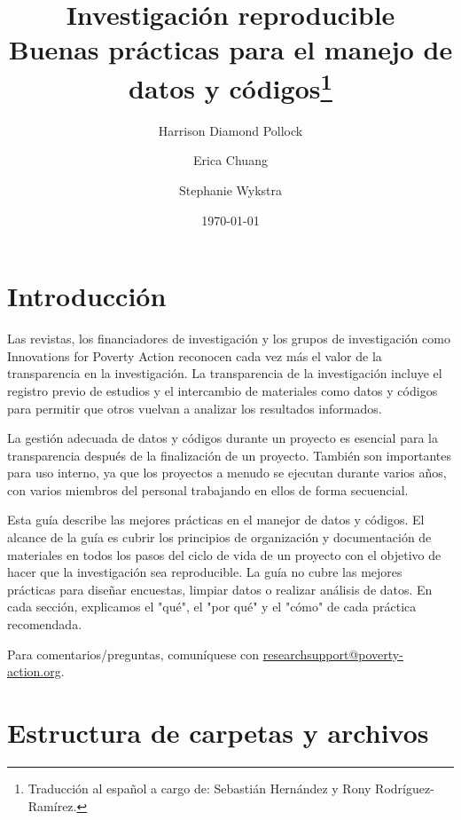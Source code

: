 \documentclass[11pt,en]{elegantpaper}
\title{Investigación reproducible \\ Buenas prácticas para el manejo de datos y códigos\footnote{Traducción al español a cargo de: Sebastián Hernández y Rony Rodríguez-Ramírez.}}
\author{Harrison Diamond Pollock \and Erica Chuang \and Stephanie Wykstra}
\date{\today}
\begin{document}
\maketitle
\tableofcontents
\newpage 
\section{Introducción}
\label{sec:intro}

Las revistas, los financiadores de investigación y los grupos de investigación como Innovations for Poverty Action reconocen cada vez más el valor de la transparencia en la investigación. La transparencia de la investigación incluye el registro previo de estudios y el intercambio de materiales como datos y códigos para permitir que otros vuelvan a analizar los resultados informados.

La gestión adecuada de datos y códigos durante un proyecto es esencial para la transparencia después de la finalización de un proyecto. También son importantes para uso interno, ya que los proyectos a menudo se ejecutan durante varios años, con varios miembros del personal trabajando en ellos de forma secuencial.

Esta guía describe las mejores prácticas en el manejor de datos y códigos. El alcance de la guía es cubrir los principios de organización y documentación de materiales en todos los pasos del ciclo de vida de un proyecto con el objetivo de hacer que la investigación sea reproducible. La guía no cubre las mejores prácticas para diseñar encuestas, limpiar datos o realizar análisis de datos. En cada sección, explicamos el "qué", el "por qué" y el "cómo" de cada práctica recomendada.

Para comentarios/preguntas, comuníquese con \href{mailto:researchsupport@poverty-action.org}{researchsupport@poverty-action.org}.

\newpage 
\section{Estructura de carpetas y archivos}
\label{sec:estructura}
\end{document}
